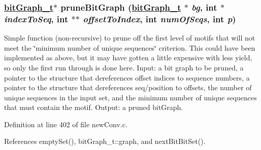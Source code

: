 \hypertarget{gemoda-s_8c_a6}{
\subsubsection[pruneBitGraph]{\setlength{\rightskip}{0pt plus 5cm}\hyperlink{structbitGraph__t}{bit\-Graph\_\-t}$\ast$ prune\-Bit\-Graph (\hyperlink{structbitGraph__t}{bit\-Graph\_\-t} $\ast$ {\em bg}, int $\ast$ {\em index\-To\-Seq}, int $\ast$$\ast$ {\em offset\-To\-Index}, int {\em num\-Of\-Seqs}, int {\em p})}}
\label{gemoda-s_8c_a6}


Simple function (non-recursive) to prune off the first level of motifs that will not meet the \char`\"{}minimum number of unique sequences\char`\"{} criterion. This could have been implemented as above, but it may have gotten a little expensive with less yield, so only the first run through is done here. Input: a bit graph to be pruned, a pointer to the structure that dereferences offset indices to sequence numbers, a pointer to the structure that dereferences seq/position to offsets, the number of unique sequences in the input set, and the minimum number of unique sequences that must contain the motif. Output: a pruned bit\-Graph.

Definition at line 402 of file new\-Conv.c.

References empty\-Set(), bit\-Graph\_\-t::graph, and next\-Bit\-Bit\-Set().

